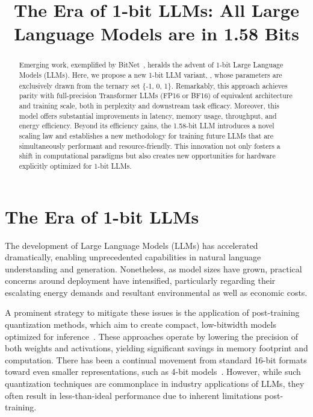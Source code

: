 \title{The Era of 1-bit LLMs: All Large Language Models are in 1.58 Bits}

\begin{abstract}
Emerging work, exemplified by BitNet~\cite{bitnet}, heralds the advent of 1-bit Large Language Models (LLMs). Here, we propose a new 1-bit LLM variant, \textbf{}, whose parameters are exclusively drawn from the ternary set \{-1, 0, 1\}. Remarkably, this approach achieves parity with full-precision Transformer LLMs (FP16 or BF16) of equivalent architecture and training scale, both in perplexity and downstream task efficacy. Moreover, this model offers substantial improvements in latency, memory usage, throughput, and energy efficiency. Beyond its efficiency gains, the 1.58-bit LLM introduces a novel scaling law and establishes a new methodology for training future LLMs that are simultaneously performant and resource-friendly. This innovation not only fosters a shift in computational paradigms but also creates new opportunities for hardware explicitly optimized for 1-bit LLMs.
\end{abstract}

\section{The Era of 1-bit LLMs}

The development of Large Language Models (LLMs) has accelerated dramatically, enabling unprecedented capabilities in natural language understanding and generation. Nonetheless, as model sizes have grown, practical concerns around deployment have intensified, particularly regarding their escalating energy demands and resultant environmental as well as economic costs.

A prominent strategy to mitigate these issues is the application of post-training quantization methods, which aim to create compact, low-bitwidth models optimized for inference~\cite{smoothquant, gptq, quip, quip_sharp}. These approaches operate by lowering the precision of both weights and activations, yielding significant savings in memory footprint and computation. There has been a continual movement from standard 16-bit formats toward even smaller representations, such as 4-bit models~\cite{gptq, awq}. However, while such quantization techniques are commonplace in industry applications of LLMs, they often result in less-than-ideal performance due to inherent limitations post-training.

